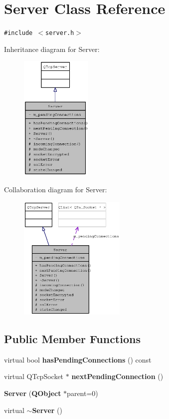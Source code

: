 \section{Server Class Reference}
\label{classServer}
{\tt \#include $<$server.h$>$}

Inheritance diagram for Server:\nopagebreak
\begin{figure}[H]
\begin{center}
\leavevmode
\includegraphics[width=97pt]{classServer__inherit__graph}
\end{center}
\end{figure}
Collaboration diagram for Server:\nopagebreak
\begin{figure}[H]
\begin{center}
\leavevmode
\includegraphics[width=144pt]{classServer__coll__graph}
\end{center}
\end{figure}
\subsection*{Public Member Functions}
\begin{CompactItemize}
\item 
virtual bool {\bf hasPendingConnections} () const 
\item 
virtual QTcpSocket $\ast$ {\bf nextPendingConnection} ()
\item 
{\bf Server} ({\bf QObject} $\ast$parent=0)
\item 
virtual {\bf $\sim$Server} ()
\end{CompactItemize}
